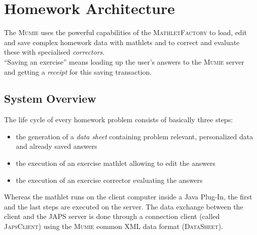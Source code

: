 \documentclass[a4paper,12pt]{article}
\newcommand{\name}[1]{\textsc{#1}}
\newcommand{\mf}{\name{MathletFactory }}
\newcommand{\mumie}{\name{Mumie }}
\begin{document}




\newpage

\section{Homework Architecture}

The \mumie uses the powerful capabilities of the \mf to load, edit and save complex homework data with mathlets and
to correct and evaluate these with specialised \textit{correctors}.\\
``Saving an exercise'' means loading up the user's answers to the \mumie server and getting a \textit{receipt}
for this saving transaction.

\subsection{System Overview}

The life cycle of every homework problem consists of basically three steps:
\begin{itemize}
\item the generation of a \textit{data sheet} containing problem relevant, personalized data and
already saved answers
\item the execution of an exercise mathlet allowing to edit the answers
\item the execution of an exercise corrector evaluating the answers
\end{itemize}

Whereas the mathlet runs on the client computer inside a Java Plug-In, the first and the last steps are
executed on the server. The data exchange between the client and the \name{JAPS} server is done through 
a connection client (called \name{JapsClient}) using the \mumie common XML data format (\name{DataSheet}).
\end{document}

